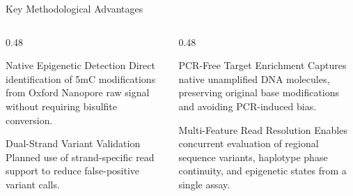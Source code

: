 \documentclass[aspectratio=169, 10pt]{beamer}
\begin{document}
\begin{frame}{Key Methodological Advantages}
    \begin{columns}[T]
        \begin{column}{0.48\textwidth}
            \begin{block}{Native Epigenetic Detection}
                \footnotesize
                Direct identification of 5mC modifications from Oxford Nanopore raw signal without requiring bisulfite conversion.
            \end{block}
            \vspace{0.2cm}
            \begin{block}{Dual-Strand Variant Validation}
                \footnotesize
                Planned use of strand-specific read support to reduce false-positive variant calls.
            \end{block}
        \end{column}

        \begin{column}{0.48\textwidth}
            \begin{block}{PCR-Free Target Enrichment}
                \footnotesize
                Captures native unamplified DNA molecules, preserving original base modifications and avoiding PCR-induced bias.
            \end{block}
            \vspace{0.2cm}
            \begin{block}{Multi-Feature Read Resolution}
                \footnotesize
                Enables concurrent evaluation of regional sequence variants, haplotype phase continuity, and epigenetic states from a single assay.
            \end{block}
        \end{column}
    \end{columns}
\end{frame}
\end{document}

